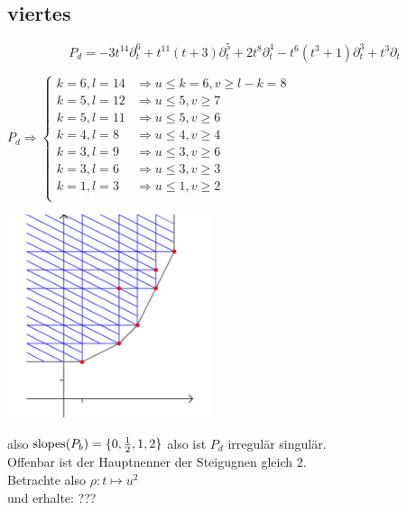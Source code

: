 \subsection{viertes}

\[
  P_d=-3t^{14}\partial_t^6+t^{11}(t+3)\partial_t^5 + 2t^8\partial_t^4
  -t^6(t^3+1)\partial_t^3 + t^3\partial_t
\]

$ P_d \Rightarrow
\begin{cases}
  k=6,l=14 & \Rightarrow u\leq k=6, v\geq l-k=8\\
  k=5,l=12 & \Rightarrow u\leq 5, v\geq 7\\
  k=5,l=11 & \Rightarrow u\leq 5, v\geq 6\\
  k=4,l=8 & \Rightarrow u\leq 4, v\geq 4\\
  k=3,l=9 & \Rightarrow u\leq 3, v\geq 6\\
  k=3,l=6 & \Rightarrow u\leq 3, v\geq 3\\
  k=1,l=3 & \Rightarrow u\leq 1, v\geq 2\\
\end{cases} $

\begin{center}
  \includegraphics[width=6cm]{beispiele/img/d.png}
\end{center}
also $\operatorname{slopes}(P_b)=\{0,\frac{1}{2},1,2\}$ also ist $P_d$ irregulär singulär.\\
Offenbar ist der Hauptnenner der Steigugnen gleich $2$.\\
Betrachte also $\rho:t\mapsto u^2$\\
und erhalte: ???

